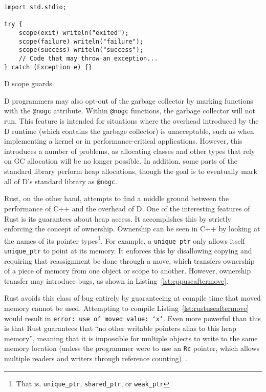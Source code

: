 \documentclass[finalcopy]{srpaper}
\begin{document}
\begin{listing}[H]
\begin{verbatim}
import std.stdio;

try {
    scope(exit) writeln("exited");
    scope(failure) writeln("failure");
    scope(success) writeln("success");
    // Code that may throw an exception...
} catch (Exception e) {}
\end{verbatim}
\caption{D scope guards.}
\label{lst:dscope}
\end{listing}

D programmers may also opt-out of the garbage collector by marking functions
with the \texttt{@nogc} attribute. Within \texttt{@nogc} functions, the garbage
collector will not run. This feature is intended for situations where the
overhead introduced by the D runtime (which contains the garbage collector) is
unacceptable, such as when implementing a kernel or in performance-critical
applications. However, this introduces a number of problems, as allocating
classes and other types that rely on GC allocation will be no longer possible.
In addition, some parts of the standard library perform heap allocations,
though the goal is to eventually mark all of D's standard library as
\texttt{@nogc}.

Rust, on the other hand, attempts to find a middle ground between the
performance of C++ and the overhead of D. One of the interesting features of
Rust is its guarantees about heap access. It accomplishes this by strictly
enforcing the concept of ownership. Ownership can be seen in C++ by looking at
the names of its pointer types\footnote{That is, \texttt{unique\_ptr},
\texttt{shared\_ptr}, or \texttt{weak\_ptr}}. For example, a
\texttt{unique\_ptr} only allows itself \texttt{unique\_ptr} to point at its
memory. It enforces this by disallowing copying and requiring that reassignment
be done through a move, which transfers ownership of a piece of memory from one
object or scope to another. However, ownership transfer may introduce bugs, as
shown in Listing~\ref{lst:cppuseaftermove}.

Rust avoids this class of bug entirely by guaranteeing at compile time that
moved memory cannot be used. Attempting to compile
Listing~\ref{lst:rustuseaftermove} would result in \texttt{error: use of moved
value: `x`}. Even more powerful than this is that Rust guarantees that ``no
other writable pointers alias to this heap memory'', meaning that it is
impossible for multiple objects to write to the same memory location (unless
the programmer were to use an \texttt{Rc} pointer, which allows multiple
readers and writers through reference counting)~\cite{RustPointerGuide}.
\end{document}
